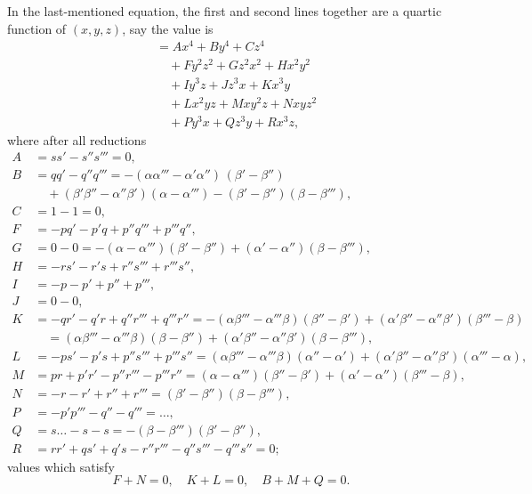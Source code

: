 \documentclass[11pt]{article}
\begin{document}
In the last-mentioned equation, the first and second lines together are a quartic function of $(x,y,z)$, say the value is
\begin{align*}
&= Ax^4 + By^4 + Cz^4\\
&\quad + Fy^2z^2 + Gz^2x^2 + Hx^2y^2\\
&\quad + Iy^3z + Jz^3x + Kx^3y\\
&\quad + Lx^2yz + Mxy^2z + Nxyz^2\\
&\quad + Py^3x + Qz^3y + Rx^3z,
\end{align*}
where after all reductions
\begin{align*}
A &= ss' - s''s''' = 0,\\
B &= qq' - q''q''' = -(\alpha\alpha''' - \alpha'\alpha'')\,(\beta' - \beta'')\\
&\quad + (\beta'\beta'' - \alpha''\beta')(\alpha - \alpha''') - (\beta' - \beta'')(\beta - \beta'''),\\
C &= 1 - 1 = 0,\\
F &= -pq' - p'q + p''q''' + p'''q'',\\
G &= 0 - 0 = -(\alpha - \alpha''')(\beta' - \beta'') + (\alpha' - \alpha'')(\beta - \beta'''),\\
H &= -rs' - r's + r''s''' + r'''s'',\\
I &= -p - p' + p'' + p''',\\
J &= 0 - 0,\\
K &= -qr' - q'r + q''r''' + q'''r'' = -(\alpha\beta''' - \alpha'''\beta)(\beta'' - \beta') + (\alpha'\beta'' - \alpha''\beta')(\beta''' - \beta)\\
&\quad = (\alpha\beta''' - \alpha'''\beta)(\beta - \beta'') + (\alpha'\beta'' - \alpha''\beta')(\beta - \beta'''),\\
L &= -ps' - p's + p''s''' + p'''s'' = (\alpha\beta''' - \alpha'''\beta)(\alpha'' - \alpha') + (\alpha'\beta'' - \alpha''\beta')(\alpha''' - \alpha),\\
M &= pr + p'r' - p''r''' - p'''r'' = (\alpha - \alpha''')(\beta'' - \beta') + (\alpha' - \alpha'')(\beta''' - \beta),\\
N &= -r - r' + r'' + r''' = (\beta' - \beta'')(\beta - \beta'''),\\
P &= -p'p''' - q'' - q'''=\ldots,\\
Q &= s\ldots - s - s = -(\beta - \beta''')(\beta' - \beta''),\\
R &= rr' + qs' + q's - r''r''' - q''s''' - q'''s'' = 0;
\end{align*}
values which satisfy
\[ F + N = 0,\quad K + L = 0,\quad B + M + Q = 0. \]
\end{document}

